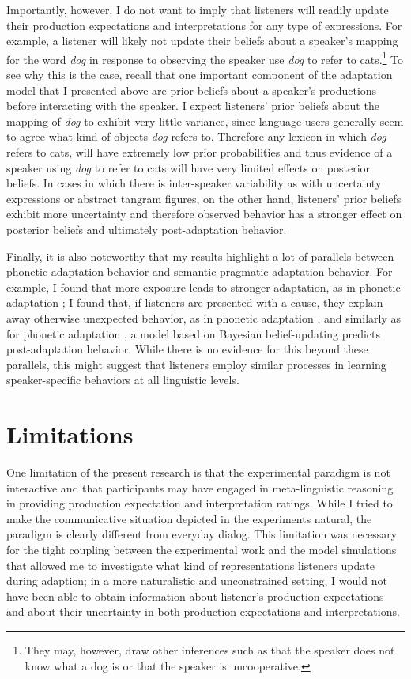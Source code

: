 Importantly, however, I do not want to imply that listeners will readily update their production expectations and interpretations for any type of expressions. For example, a listener will likely not
update their beliefs about a speaker's mapping for the word \textit{dog} in response to observing the speaker use \textit{dog} to refer to cats.\footnote{They may, however, draw other inferences such as that the speaker does not know what a dog is or that the speaker is uncooperative.} To see why this is the case, recall that one important component of the adaptation model that I presented above are prior beliefs about a speaker's productions before interacting with the speaker. I expect listeners' prior beliefs about the mapping of \textit{dog} to exhibit very little variance, since language users generally seem to agree what kind of objects \textit{dog} refers to. Therefore any lexicon in which \textit{dog} refers to cats, will have extremely low prior probabilities and thus evidence of a speaker using \textit{dog} to refer to cats will have very limited effects on posterior beliefs. In cases in which there is inter-speaker variability as with uncertainty expressions or abstract tangram figures, on the other hand,  listeners' prior beliefs exhibit more uncertainty and therefore observed behavior has a stronger effect on posterior beliefs and ultimately post-adaptation behavior.

Finally, it is also noteworthy that my results highlight a lot of parallels between phonetic adaptation behavior and semantic-pragmatic adaptation behavior. For example, I found that more exposure leads to stronger adaptation, as in phonetic adaptation \parencite{Vroomen2007}; I found that,  if listeners are presented with a cause,  they explain away otherwise unexpected behavior, as in phonetic adaptation \parencite{Kraljic2008}, and similarly as for phonetic adaptation \parencite{Kleinschmidt2015}, a model based on Bayesian belief-updating predicts post-adaptation behavior. While there is no evidence for this beyond these parallels, this might suggest that listeners employ similar processes in learning speaker-specific behaviors at all linguistic levels.



\section{Limitations}

One limitation of the present research is that the experimental paradigm is not interactive and that participants may have 
engaged in meta-linguistic reasoning in providing production expectation and interpretation ratings. 
While I tried to make the communicative situation depicted in the experiments natural,
the paradigm is clearly different from everyday dialog. This limitation was necessary for the tight coupling between the experimental work
and the model simulations that allowed me to investigate what kind of representations listeners update during adaption; in a more
naturalistic and unconstrained setting, I would not have been able to obtain information about listener's production expectations and about their
uncertainty in both production expectations and interpretations. 

